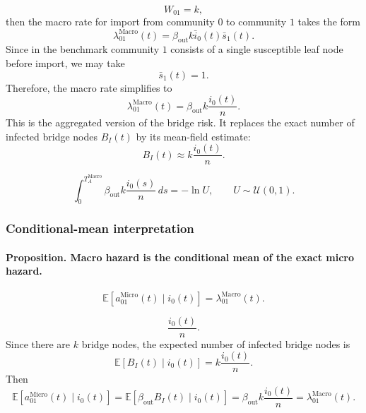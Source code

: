 \documentclass[a4paper,fleqn]{cas-sc}
\newcommand{\ReadStatusTwo}[5]{}
\begin{document}
\[
W_{01}=k,
\]
then the macro rate for import from community \(0\) to community \(1\) takes the form
\[
\lambda_{01}^{\mathrm{Macro}}(t)
=
\beta_{\mathrm{out}} k \bar{i}_0(t)\bar{s}_1(t).
\]
Since in the benchmark community \(1\) consists of a single susceptible leaf node before import, we may take
\[
\bar{s}_1(t)=1.
\]
Therefore, the macro rate simplifies to
\[
\lambda_{01}^{\mathrm{Macro}}(t)
=
\beta_{\mathrm{out}} k\frac{i_0(t)}{n}.
\]
This is the aggregated version of the bridge risk. It replaces the exact number of infected bridge nodes \(B_I(t)\) by its mean-field estimate:
\[
B_I(t)
\approx
k\frac{i_0(t)}{n}.
\]

\[
\int_0^{T_A^{\mathrm{Macro}}}
\beta_{\mathrm{out}} k\frac{i_0(s)}{n}\,ds
=
-\ln U,
\qquad U\sim\mathcal U(0,1).
\]

\subsubsection{Conditional-mean interpretation}
\ReadStatusTwo{Conditional-mean interpretation}{Yulian}{1}{Michael}{0}

\paragraph{Proposition. Macro hazard is the conditional mean of the exact micro hazard.}
\[
\mathbb{E}
\left[
a_{01}^{\mathrm{Micro}}(t)
\mid i_0(t)
\right]
=
\lambda_{01}^{\mathrm{Macro}}(t).
\]

\[
\frac{i_0(t)}{n}.
\]
Since there are \(k\) bridge nodes, the expected number of infected bridge nodes is
\[
\mathbb{E}[B_I(t)\mid i_0(t)]
=
k\frac{i_0(t)}{n}.
\]
Then
\[
\mathbb{E}
\left[
a_{01}^{\mathrm{Micro}}(t)
\mid i_0(t)
\right]
=
\mathbb{E}
\left[
\beta_{\mathrm{out}} B_I(t)
\mid i_0(t)
\right]
=
\beta_{\mathrm{out}} k\frac{i_0(t)}{n}
=
\lambda_{01}^{\mathrm{Macro}}(t).
\]
\end{document}
